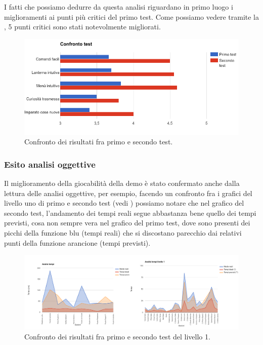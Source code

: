 I fatti che possiamo dedurre da questa analisi riguardano in primo luogo i miglioramenti ai punti più critici del primo test. Come possiamo vedere tramite la \myfig{\ref{fig:test-confronto}}, 5 punti critici sono stati notevolmente migliorati.

\begin{figure}[h]
\centerline{\includegraphics[scale=0.55]{images/risultati/test-confronto.png}}
\caption{Confronto dei risultati fra primo e secondo test.}
\label{fig:test-confronto}
\end{figure}

\subsubsection{Esito analisi oggettive}

Il miglioramento della giocabilità della demo è stato confermato anche dalla lettura delle analisi oggettive, per esempio, facendo un confronto fra i grafici del livello uno di primo e secondo test (vedi \myfig{\ref{fig:test-confronto-tempi1}}) possiamo notare che nel grafico del secondo test, l'andamento dei tempi reali segue abbastanza bene quello dei tempi previsti, cosa non sempre vera nel grafico del primo test, dove sono presenti dei picchi della funzione blu (tempi reali) che si discostano parecchio dai relativi punti della funzione arancione (tempi previsti).

\begin{figure}[h]
\centerline{\includegraphics[scale=0.35]{images/risultati/test-confronto-tempi1.png}}
\caption{Confronto dei risultati fra primo e secondo test del livello 1.}
\label{fig:test-confronto-tempi1}
\end{figure}

